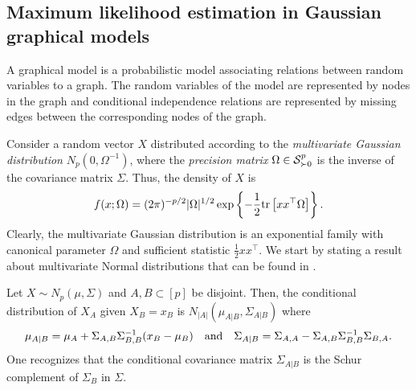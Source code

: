 \subsection{Maximum likelihood estimation in Gaussian graphical models}

A graphical model is a probabilistic model associating relations between random variables to a graph. The random variables of the model are represented by nodes in the graph and conditional independence relations are represented by missing edges between the corresponding nodes of the graph.

Consider a random vector $X$ distributed according to the \textit{multivariate Gaussian distribution} $N_p(0, \Omega^{-1})$, where the \textit{precision matrix} $\Omega \in \S^p_{\succ 0}$ is the inverse of the covariance matrix $\Sigma$. Thus, the density of $X$ is
\begin{equation} \label{eq-density-gaussian}
    f(x; \Omega) = (2\pi)^{-p/2} |\Omega|^{1/2} \expfc{-\frac{1}{2} \trB{xx^\top \Omega} }.
\end{equation}
Clearly, the multivariate Gaussian distribution is an exponential family with canonical parameter $\Omega$ and sufficient statistic $\frac{1}{2}xx^\top$. We start by stating a result about multivariate Normal distributions that can be found in \cite[Proposition C.5]{lauritzen1996}. 

\begin{lemma} \label{lem-gaussian-cond}
    Let $X \sim N_p(\mu, \Sigma)$ and $A, B \subset [p]$ be disjoint. Then, the conditional distribution of $X_A$ given $X_B = x_B$ is $N_{|A|}(\mu_{A|B}, \Sigma_{A|B})$ where
    \begin{align*}
        \mu_{A|B} = \mu_A + \Sigma_{A,B}\Sigma^{-1}_{B,B}(x_B - \mu_B) && \t{and} && \Sigma_{A|B} = \Sigma_{A,A} - \Sigma_{A,B}\Sigma^{-1}_{B,B}\Sigma_{B,A}.
    \end{align*} 
    One recognizes that the conditional covariance matrix $\Sigma_{A|B}$ is the Schur complement of $\Sigma_B$ in $\Sigma$.
\end{lemma}


